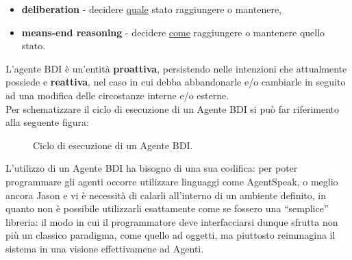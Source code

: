\documentclass[12pt,a4paper,openright,oneside]{report}
\newcommand{\quotes}[1]{``#1''}
\begin{document}
\begin{itemize}
	\item \textbf{deliberation} - decidere \ul{quale} stato raggiungere o mantenere,
	\item \textbf{means-end reasoning} - decidere \ul{come} raggiungere o mantenere quello stato.
\end{itemize}

L'agente BDI è un'entità \textbf{proattiva}, persistendo nelle intenzioni che attualmente possiede e \textbf{reattiva}, nel caso in cui debba abbandonarle e/o cambiarle in seguito ad una modifica delle circostanze interne e/o esterne.\\

Per schematizzare il ciclo di esecuzione di un Agente BDI si può far riferimento alla seguente figura:

\begin{figure}[h]
	\centering
	\caption{Ciclo di esecuzione di un Agente BDI.}
	\label{fig:jacamo}
\end{figure}

L'utilizzo di un Agente BDI ha bisogno di una sua codifica: per poter programmare gli agenti occorre utilizzare linguaggi come AgentSpeak, o meglio ancora Jason e vi è necessità di calarli all'interno di un ambiente definito, in quanto non è possibile utilizzarli esattamente come se fossero una \quotes{semplice} libreria: il modo in cui il programmatore deve interfacciarsi dunque sfrutta non più un classico paradigma, come quello ad oggetti, ma piuttosto reimmagina il sistema in una visione effettivamene ad Agenti.
\end{document}
